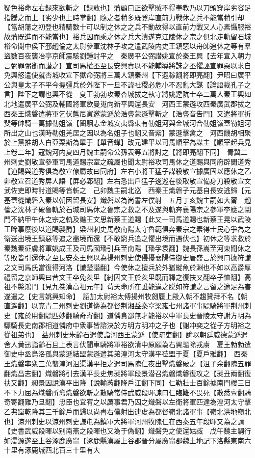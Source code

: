 疑色裕命左右録來欲斬之【録敢也】藩顧曰正欲擊賊不得奉教乃以刀頭穿岸劣容足指騰之而上【劣少也上時掌翻】隨之者稍多既登岸直前力戰休之兵不能當稍引却【當胡藩之初登也精騎數十可以制之休之之兵不動故得以直前力戰又人心素懾服裕故藩既進而不能當也】裕兵因而乘之休之兵大潰遂克江陵休之宗之俱北走軌留石城裕命閬中侯下邳趙倫之太尉參軍沈林子攻之遣武陵内史王鎮惡以舟師追休之等有羣盜數百夜襲冶亭京師震駭劉鍾討平之　秦廣平公弼譛姚宣於秦王興【去年宣入朝力言弼罪弼銜而譛之】宣司馬權丕至長安興責以不能輔導將誅之丕懼誣宣罪惡以求自免興怒遣使就杏城收宣下獄命弼將三萬人鎮秦州【下遐稼翻將即亮翻】尹昭曰廣平公與皇太子不平今握彊兵於外陛下一旦不諱社稷必危小不忍亂大謀【論語載孔子之言】陛下之謂也興不從　夏王勃勃攻秦杏城拔之執守將姚逵阬士卒二萬人秦王興如北地遣廣平公弼及輔國將軍歛曼嵬向新平興還長安　河西王蒙遜攻西秦廣武郡拔之西秦王熾磐遣將軍乞伏魋尼寅邀蒙遜於浩亹蒙遜擊斬之【浩亹音告門】又遣將軍折斐等帥騎一萬據勒姐嶺【闞駰志金城安夷縣東有勒姐河與金城河合勒姐嶺蓋勒姐河所出之山也漢時勒姐羌居之因以為名姐子也翻又音紫】蒙遜擊禽之　河西饑胡相聚於上黨推胡人白亞栗斯為單于【單音蟬】改元建平以司馬順宰為謀主【順宰起兵見上卷二年】寇魏河内夏四月魏主嗣命公孫表等五將討之【將即亮翻下同】　青冀二州刺史劉敬宣參軍司馬道賜宗室之疏屬也聞太尉裕攻司馬休之道賜與同府辟閭道秀【道賜與道秀俱為敬宣僚屬故曰同府】左右小將王猛子謀殺敬宣據廣固以應休之乙卯敬宣召道秀屏人語【屏必郢翻】左右悉出戶猛子逡巡在後取敬宣備身刀殺敬宣文武佐吏即時討道賜等皆斬之　己卯魏主嗣北巡　西秦王熾磐子元基自長安逃歸【元基蓋從熾磐入秦以朝因留長安】熾磐以為尚書左僕射　五月丁亥魏主嗣如大甯　趙倫之沈林子破魯軌於石城司馬休之魯宗之救之不及遂與軌奔襄陽宗之參軍李應之閉門不納甲午休之宗之軌及譙王文思新蔡王道賜【此又一司馬道賜也新蔡王晃以武陵王晞事廢後以道賜襲爵】梁州刺史馬敬南陽太守魯範俱奔秦宗之素得士民心爭為之衛送出境王鎮惡等追之盡境而還【不敢窮兵追之懼出境而遇伏也】初休之等求救於秦魏秦征虜將軍姚成王及司馬國璠引兵至南陽【璠孚袁翻】魏長孫嵩至河東聞休之等敗皆引還休之至長安秦王興以為揚州刺史使侵擾襄陽侍御史唐盛言於興曰據符䜟之文司馬氏當復得河洛【䜟楚譛翻】今使休之擅兵於外猶縱魚於淵也不如以高爵厚禮留之京師興曰昔文王卒免羑里【紂囚文王於羑里既而釋之復扶又翻卒子恤翻】高祖不斃鴻門【見九卷漢高祖元年】苟天命所在誰能違之脱如符䜟之言留之適足為害遂遣之【史言姚興知命】　詔加太尉裕太傅揚州牧劒履上殿入朝不趨贊拜不名【朝直遙翻】以兖青二州刺史劉道憐為都督荆湘益秦寜梁雍七州諸軍事驃騎將軍荆州刺史【雍於用翻驃匹妙翻騎奇寄翻】道憐貪鄙無才能裕以中軍長史晉陵太守謝方明為驃騎長史南郡相道憐府中衆事皆諮決於方明方明冲之子也【謝冲奕之從子方明裕之從祖弟也】　益州刺史朱齡石遣使詣河西王蒙遜【使疏吏翻】諭以朝廷威德蒙遜遣舍人黄迅詣齡石且上表言伏聞車騎將軍裕欲清中原願為右翼驅除戎虜　夏王勃勃遣御史中丞烏洛孤與蒙遜結盟蒙遜遣其弟湟河太守漢平莅盟于夏【夏戶雅翻】　西秦王熾磐率衆三萬襲湟河沮渠漢平拒之遣司馬隗仁夜出擊熾磐破之【沮子余翻隗五罪翻熾昌志翻】熾磐將引去漢平長史焦昶將軍段景潜召熾磐熾磐復攻之【昶丑兩翻復扶又翻】昶景因說漢平出降【說輸芮翻降戶江翻下同】仁勒壯士百餘據南門樓三日不下力屈為熾磐所禽熾磐欲斬之散騎常侍武威段暉諫曰仁臨難不畏死【散悉亶翻騎奇寄翻難乃旦翻】忠臣也宜宥之以厲事君乃囚之熾磐以左衛將軍匹達為湟河太守擊乙弗窟乾降其三千餘戶而歸以尚書右僕射出連䖍為都督嶺北諸軍事【嶺北洪地嶺北也】涼州刺史以涼州刺史謙屯為鎮軍大將軍河州牧隗仁在西秦五年段暉又為之請【史書武威段暉以别南燕之段暉也又為于偽翻】熾磐免之使還姑臧　戊午魏主嗣行如濡源遂至上谷涿鹿廣甯【涿鹿縣漢屬上谷郡晉分屬廣甯郡魏土地記下洛縣東南六十里有涿鹿城西北百三十里有大